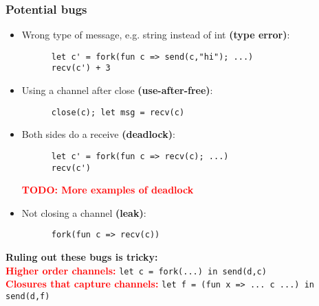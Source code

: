 \documentclass[aspectratio=169]{beamer}
\newcommand{\remph}[1] {\textcolor{red}{\textbf{#1}}}
\begin{document}
\begin{frame}[fragile]
  \frametitle{Potential bugs}

  \begin{itemize}
    \item Wrong type of message, e.g. string instead of int \textbf{(type error)}:
    \begin{lstlisting}
      let c' = fork(fun c => send(c,"hi"); ...)
      recv(c') + 3
    \end{lstlisting}
    \item Using a channel after close \textbf{(use-after-free)}:
    \begin{lstlisting}
      close(c); let msg = recv(c)
    \end{lstlisting}
    \item Both sides do a receive \textbf{(deadlock)}:
    \begin{lstlisting}
      let c' = fork(fun c => recv(c); ...)
      recv(c')
    \end{lstlisting}

    \remph{TODO: More examples of deadlock}

    \item Not closing a channel \textbf{(leak)}:
    \begin{lstlisting}
      fork(fun c => recv(c))
    \end{lstlisting}
  \end{itemize}
  \textbf{Ruling out these bugs is tricky:}\\
  \remph{Higher order channels: } \lstinline|let c = fork(...) in send(d,c)| \\
  \remph{Closures that capture channels: } \lstinline|let f = (fun x => ... c ...) in send(d,f)|
\end{frame}
\end{document}
